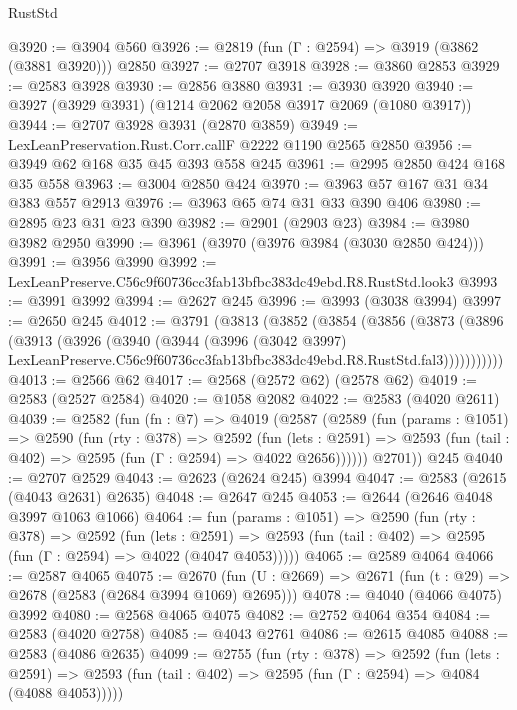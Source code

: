 \begin{lexlean}{RustStd}
\begin{coremodule}
@3920 := @3904 @560
@3926 := @2819 (fun (Γ : @2594) => @3919 (@3862 (@3881 @3920))) @2850
@3927 := @2707 @3918
@3928 := @3860 @2853
@3929 := @2583 @3928
@3930 := @2856 @3880
@3931 := @3930 @3920
@3940 := @3927 (@3929 @3931) (@1214 @2062 @2058 @3917 @2069 (@1080 @3917))
@3944 := @2707 @3928 @3931 (@2870 @3859)
@3949 := LexLeanPreservation.Rust.Corr.callF @2222 @1190 @2565 @2850
@3956 := @3949 @62 @168 @35 @45 @393 @558 @245
@3961 := @2995 @2850 @424 @168 @35 @558
@3963 := @3004 @2850 @424
@3970 := @3963 @57 @167 @31 @34 @383 @557 @2913
@3976 := @3963 @65 @74 @31 @33 @390 @406
@3980 := @2895 @23 @31 @23 @390
@3982 := @2901 (@2903 @23)
@3984 := @3980 @3982 @2950
@3990 := @3961 (@3970 (@3976 @3984 (@3030 @2850 @424)))
@3991 := @3956 @3990
@3992 := LexLeanPreserve.C56c9f60736cc3fab13bfbc383dc49ebd.R8.RustStd.look3
@3993 := @3991 @3992
@3994 := @2627 @245
@3996 := @3993 (@3038 @3994)
@3997 := @2650 @245
@4012 := @3791
    (@3813
      (@3852
        (@3854
          (@3856
            (@3873
              (@3896
                (@3913
                  (@3926
                    (@3940
                      (@3944
                        (@3996
                          (@3042 @3997)
                          LexLeanPreserve.C56c9f60736cc3fab13bfbc383dc49ebd.R8.RustStd.fal3)))))))))))
@4013 := @2566 @62
@4017 := @2568 (@2572 @62) (@2578 @62)
@4019 := @2583 (@2527 @2584)
@4020 := @1058 @2082
@4022 := @2583 (@4020 @2611)
@4039 := @2582
    (fun (fn : @7) =>
    @4019
      (@2587
        (@2589
          (fun (params : @1051) =>
          @2590
            (fun (rty : @378) =>
            @2592
              (fun (lets : @2591) =>
              @2593 (fun (tail : @402) => @2595 (fun (Γ : @2594) => @4022 @2656))))))
        @2701))
    @245
@4040 := @2707 @2529
@4043 := @2623 (@2624 @245) @3994
@4047 := @2583 (@2615 (@4043 @2631) @2635)
@4048 := @2647 @245
@4053 := @2644 (@2646 @4048 @3997 @1063 @1066)
@4064 := fun (params : @1051) =>
  @2590
    (fun (rty : @378) =>
    @2592
      (fun (lets : @2591) =>
      @2593 (fun (tail : @402) => @2595 (fun (Γ : @2594) => @4022 (@4047 @4053)))))
@4065 := @2589 @4064
@4066 := @2587 @4065
@4075 := @2670 (fun (U : @2669) => @2671 (fun (t : @29) => @2678 (@2583 (@2684 @3994 @1069) @2695)))
@4078 := @4040 (@4066 @4075) @3992
@4080 := @2568 @4065 @4075
@4082 := @2752 @4064 @354
@4084 := @2583 (@4020 @2758)
@4085 := @4043 @2761
@4086 := @2615 @4085
@4088 := @2583 (@4086 @2635)
@4099 := @2755
    (fun (rty : @378) =>
    @2592
      (fun (lets : @2591) =>
      @2593 (fun (tail : @402) => @2595 (fun (Γ : @2594) => @4084 (@4088 @4053)))))

\end{coremodule}
\end{lexlean}
